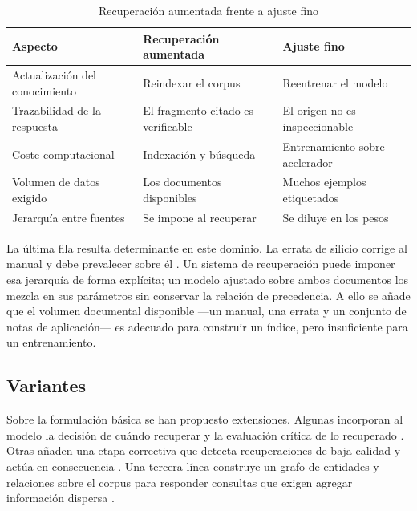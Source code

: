 \begin{table}[H]
  \centering
  \caption{Recuperación aumentada frente a ajuste fino}
  \label{tab:ragvsft}
  \begin{tabular}{@{}p{}p{}p{}@{}}
    \toprule
    \textbf{Aspecto} & \textbf{Recuperación aumentada} & \textbf{Ajuste fino} \\
    \midrule
    Actualización del conocimiento & Reindexar el corpus & Reentrenar el modelo \\
    Trazabilidad de la respuesta & El fragmento citado es verificable & El origen no es inspeccionable \\
    Coste computacional & Indexación y búsqueda & Entrenamiento sobre acelerador \\
    Volumen de datos exigido & Los documentos disponibles & Muchos ejemplos etiquetados \\
    Jerarquía entre fuentes & Se impone al recuperar & Se diluye en los pesos \\
    \bottomrule
  \end{tabular}
\end{table}

La última fila resulta determinante en este dominio. La errata de silicio
corrige al manual y debe prevalecer sobre él \cite{microchip2024errata}. Un
sistema de recuperación puede imponer esa jerarquía de forma explícita; un
modelo ajustado sobre ambos documentos los mezcla en sus parámetros sin
conservar la relación de precedencia. A ello se añade que el volumen documental
disponible —un manual, una errata y un conjunto de notas de aplicación— es
adecuado para construir un índice, pero insuficiente para un entrenamiento.

\subsection{Variantes}

Sobre la formulación básica se han propuesto extensiones. Algunas incorporan al
modelo la decisión de cuándo recuperar y la evaluación crítica de lo recuperado
\cite{asai2024selfrag}. Otras añaden una etapa correctiva que detecta
recuperaciones de baja calidad y actúa en consecuencia \cite{yan2024crag}. Una
tercera línea construye un grafo de entidades y relaciones sobre el corpus para
responder consultas que exigen agregar información dispersa \cite{edge2024graphrag}.

